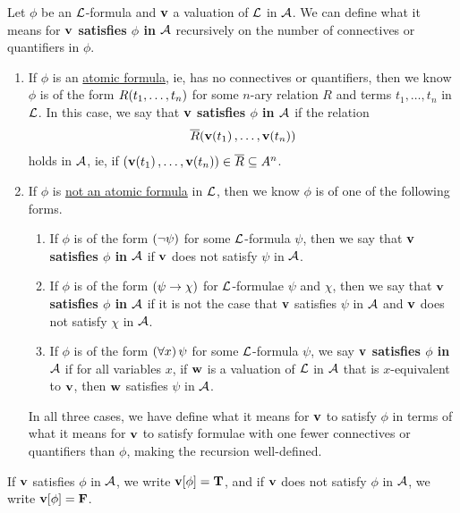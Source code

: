 \begin{boxdefinition}[Satisfaction]
    Let $\phi$ be an $\mathcal{L}$-formula and $\mathbf{v}$ a valuation of $\mathcal{L}$ in $\mathcal{A}$. We can define what it means for \textbf{$\mathbf{v}$ satisfies $\phi$ in $\mathcal{A}$} recursively on the number of connectives or quantifiers in $\phi$.
    \begin{enumerate}
        \item If $\phi$ is an \underline{atomic formula}, ie, has no connectives or quantifiers, then we know $\phi$ is of the form $R\!\left( t_1, \ldots, t_n \right)$ for some $n$-ary relation $R$ and terms $t_1, \ldots, t_n$ in $\mathcal{L}$. In this case, we say that \textbf{$\mathbf{v}$ satisfies $\phi$ in $\mathcal{A}$} if the relation
        \begin{align*}
            \overline{R}\!\left( \mathbf{v}\!\left( t_1 \right), \ldots, \mathbf{v}\!\left( t_n \right) \right)
        \end{align*}
        holds in $\mathcal{A}$, ie, if $\left( \mathbf{v}\!\left( t_1 \right), \ldots, \mathbf{v}\!\left( t_n \right) \right) \in \overline{R} \subseteq A^n$.

        \item If $\phi$ is \underline{not an atomic formula} in $\mathcal{L}$, then we know $\phi$ is of one of the following forms.
        \begin{enumerate}
            \item If $\phi$ is of the form $\left( \neg \psi \right)$ for some $\mathcal{L}$-formula $\psi$, then we say that \textbf{$\mathbf{v}$ satisfies $\phi$ in $\mathcal{A}$} if $\mathbf{v}$ does not satisfy $\psi$ in $\mathcal{A}$.
            
            \item If $\phi$ is of the form $\left( \psi \to \chi \right)$ for $\mathcal{L}$-formulae $\psi$ and $\chi$, then we say that \textbf{$\mathbf{v}$ satisfies $\phi$ in $\mathcal{A}$} if it is not the case that $\mathbf{v}$ satisfies $\psi$ in $\mathcal{A}$ and $\mathbf{v}$ does not satisfy $\chi$ in $\mathcal{A}$.
            
            \item If $\phi$ is of the form $\left( \forall x \right)\psi$ for some $\mathcal{L}$-formula $\psi$, we say \textbf{$\mathbf{v}$ satisfies $\phi$ in $\mathcal{A}$} if for all variables $x$, if $\mathbf{w}$ is a valuation of $\mathcal{L}$ in $\mathcal{A}$ that is $x$-equivalent to $\mathbf{v}$, then $\mathbf{w}$ satisfies $\psi$ in $\mathcal{A}$.
        \end{enumerate}
        In all three cases, we have define what it means for $\mathbf{v}$ to satisfy $\phi$ in terms of what it means for $\mathbf{v}$ to satisfy formulae with one fewer connectives or quantifiers than $\phi$, making the recursion well-defined.
    \end{enumerate}
    If $\mathbf{v}$ satisfies $\phi$ in $\mathcal{A}$, we write $\mathbf{v}\!\left[ \phi \right] = \mathbf{T}$, and if $\mathbf{v}$ does not satisfy $\phi$ in $\mathcal{A}$, we write $\mathbf{v}\!\left[ \phi \right] = \mathbf{F}$.
\end{boxdefinition}

